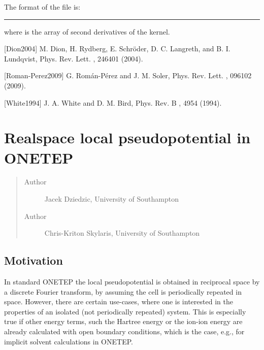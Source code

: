 \documentclass[letterpaper,10pt,english]{sphinxmanual}
\begin{document}
\begin{DUlineblock}{0em}
\item[] The format of the  file is:
\end{DUlineblock}


\bigskip\hrule\bigskip


\begin{DUlineblock}{0em}
\item[]   
\item[] 
\item[] 
\item[] 
\item[] 
\end{DUlineblock}

where  is the array of second derivatives of the kernel.

{[}Dion2004{]} M. Dion, H. Rydberg, E. Schröder, D. C. Langreth, and B. I. Lundqvist,
Phys. Rev. Lett. , 246401 (2004).

{[}Roman-Perez2009{]} G. Román-Pérez and J. M. Soler, Phys. Rev. Lett. , 096102 (2009).

{[}White1994{]} J. A. White and D. M. Bird, Phys. Rev. B , 4954 (1994).


\section{Realspace local pseudopotential in ONETEP}
\label{\detokenize{realspace_local_pseudo:realspace-local-pseudopotential-in-onetep}}\label{\detokenize{realspace_local_pseudo::doc}}\begin{quote}\begin{description}
\item[{Author}] \leavevmode
Jacek Dziedzic, University of Southampton

\item[{Author}] \leavevmode
Chris-Kriton Skylaris, University of Southampton

\end{description}\end{quote}


\subsection{Motivation}
\label{\detokenize{realspace_local_pseudo:motivation}}
In standard ONETEP the local pseudopotential is obtained in reciprocal
space by a discrete Fourier transform, by assuming the cell is
periodically repeated in space. However, there are certain use-cases,
where one is interested in the properties of an isolated (not
periodically repeated) system. This is especially true if other energy
terms, such the Hartree energy or the ion-ion energy are already
calculated with open boundary conditions, which is the case, e.g., for
implicit solvent calculations in ONETEP.
\end{document}
